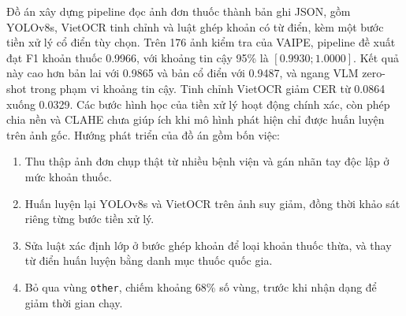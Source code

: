 Đồ án xây dựng pipeline đọc ảnh đơn thuốc thành bản ghi JSON, gồm YOLOv8s, VietOCR tinh chỉnh và luật ghép khoản có từ điển, kèm một bước tiền xử lý cổ điển tùy chọn.
Trên 176 ảnh kiểm tra của VAIPE, pipeline đề xuất đạt F1 khoản thuốc \num{0.9966}, với khoảng tin cậy 95\% là $[\num{0.9930}; \num{1.0000}]$.
Kết quả này cao hơn bản lai với \num{0.9865} và bản cổ điển với \num{0.9487}, và ngang VLM zero-shot trong phạm vi khoảng tin cậy.
Tinh chỉnh VietOCR giảm CER từ \num{0.0864} xuống \num{0.0329}.
Các bước hình học của tiền xử lý hoạt động chính xác, còn phép chia nền và CLAHE chưa giúp ích khi mô hình phát hiện chỉ được huấn luyện trên ảnh gốc.
Hướng phát triển của đồ án gồm bốn việc:
\begin{enumerate}[label=(\arabic*), leftmargin=2em, itemsep=0.15em, topsep=0.3em]
  \item Thu thập ảnh đơn chụp thật từ nhiều bệnh viện và gán nhãn tay độc lập ở mức khoản thuốc.
  \item Huấn luyện lại YOLOv8s và VietOCR trên ảnh suy giảm, đồng thời khảo sát riêng từng bước tiền xử lý.
  \item Sửa luật xác định lớp ở bước ghép khoản để loại khoản thuốc thừa, và thay từ điển huấn luyện bằng danh mục thuốc quốc gia.
  \item Bỏ qua vùng \texttt{other}, chiếm khoảng 68\% số vùng, trước khi nhận dạng để giảm thời gian chạy.
\end{enumerate}
